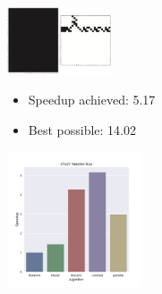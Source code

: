 \documentclass[9pt]{beamer}
\begin{document}
\begin{frame}[fragile]
\begin{columns}[t]
    \begin{column}{0.3\textwidth}
      \centering
      \includegraphics[height=2cm]{images/star_large.png}
      \footnotesize
      \begin{itemize}
        \item Speedup achieved: 5.17
        \item Best possible: 14.02
      \end{itemize}
      \includegraphics[width=4cm]{images/seissol_comparison_27x27.pdf}
    \end{column}

  \end{columns}

\end{frame}
\end{document}
